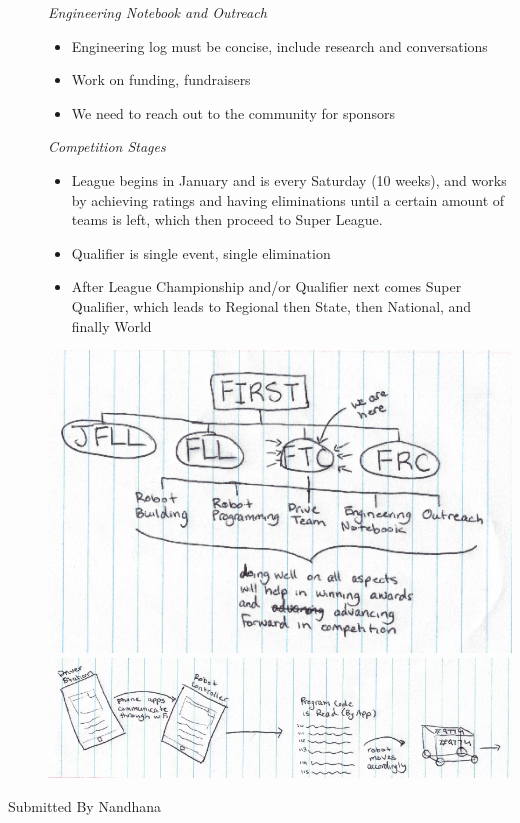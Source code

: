 \documentclass[11pt,fleqn]{book} %
\begin{document}
\begin{description}
\textit{Engineering Notebook and Outreach} 
\begin{itemize}  
\item Engineering log must be concise, include research and conversations
\item Work on funding, fundraisers
\item We need to reach out to the community for sponsors\\
\end{itemize}

\textit {Competition Stages}
\begin{itemize}  
\item League begins in January and is every Saturday (10 weeks), and works by achieving ratings and having eliminations until a certain amount of teams is left, which then proceed to Super League.
\item Qualifier is single event, single elimination
\item After League Championship and/or Qualifier next comes Super Qualifier, which leads to Regional then State, then National, and finally World\\
\end{itemize}

\includegraphics[width=.9\textwidth]{Images/Draw1.PNG}\\

\includegraphics[width=.9\textwidth]{Images/Draw2.PNG}\\

 \item [Submitted By Nandhana]\
\end{description}



\cleardoublepage
{}
\setlength{\columnsep}{0.75cm}
\printindex

\end{document}

